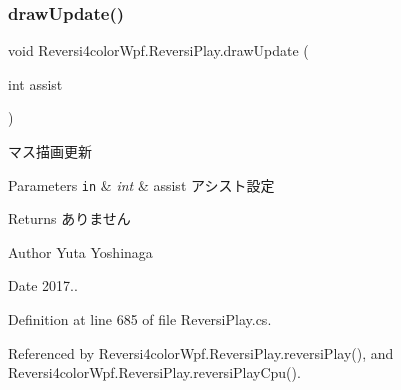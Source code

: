 \subsubsection{\texorpdfstring{draw\+Update()}{drawUpdate()}}
{\footnotesize\ttfamily void Reversi4color\+Wpf.\+Reversi\+Play.\+draw\+Update (\begin{DoxyParamCaption}\item[{int}]{assist }\end{DoxyParamCaption})}



マス描画更新 


\begin{DoxyParams}[1]{Parameters}
\mbox{\tt in}  & {\em int} & assist アシスト設定 \\
\hline
\end{DoxyParams}
\begin{DoxyReturn}{Returns}
ありません 
\end{DoxyReturn}
\begin{DoxyAuthor}{Author}
Yuta Yoshinaga 
\end{DoxyAuthor}
\begin{DoxyDate}{Date}
2017.. 
\end{DoxyDate}


Definition at line 685 of file Reversi\+Play.\+cs.



Referenced by Reversi4color\+Wpf.\+Reversi\+Play.\+reversi\+Play(), and Reversi4color\+Wpf.\+Reversi\+Play.\+reversi\+Play\+Cpu().


